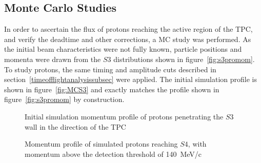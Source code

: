 \subsection{Monte Carlo Studies}
In order to ascertain the flux of protons reaching the active region of the TPC, and verify the deadtime and other corrections, a MC study was performed. 
As the initial beam characteristics were not fully known, particle positions and momenta were drawn from the $\mathit{S3}$ distributions shown in figure~\ref{fig:s3promom}. To study protons, the same timing and amplitude cuts described in section~\ref{timeofflightanalysissubsec} were applied.
The initial simulation profile is shown in figure~\ref{fig:MCS3} and exactly matches the profile shown in figure~\ref{fig:s3promom} by construction.


\begin{figure}[!ht]
  \begin{minipage}[t]{0.48\textwidth}
    \begin{adjustbox}{max totalsize={\textwidth}{.35\textheight}, center}
      
    \end{adjustbox}
    \caption{Initial simulation momentum profile of protons penetrating the $\mathit{S3}$ wall in the direction of the TPC}
    \label{fig:MCS3}
  \end{minipage}
  \hspace{0.3cm}
  \begin{minipage}[t]{0.48\textwidth}
    \begin{adjustbox}{max totalsize={\textwidth}{.35\textheight}, center}
      
    \end{adjustbox}
    \caption{Momentum profile of simulated protons reaching $\mathit{S4}$, with momentum above the detection threshold of 140~MeV/c}
    \label{fig:MCS4}
  \end{minipage}	
\end{figure}

